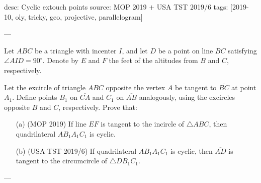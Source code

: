 desc: Cyclic extouch points
source: MOP 2019 $+$ USA TST 2019/6
tags: [2019-10, oly, tricky, geo, projective, parallelogram]

---

Let $ABC$ be a triangle with incenter $I$, and let $D$ be a point on line $BC$ satisfying $\angle AID=90^\circ$. Denote by $E$ and $F$ the feet of the altitudes from $B$ and $C$, respectively.

Let the excircle of triangle $ABC$ opposite the vertex $A$ be tangent to $\overline{BC}$ at point $A_1$. Define points $B_1$ on $\overline{CA}$ and $C_1$ on $\overline{AB}$ analogously, using the excircles opposite $B$ and $C$, respectively. Prove that:
\begin{itemize}
    \item[(a)] (MOP 2019) If line $EF$ is tangent to the incircle of $\triangle ABC$, then quadrilateral $AB_1A_1C_1$ is cyclic.
        \vspace{-0.5em}
    \item[(b)] (USA TST 2019/6) If quadrilateral $AB_1A_1C_1$ is cyclic, then $\overline{AD}$ is tangent to the circumcircle of $\triangle DB_1C_1$.
\end{itemize}

---

